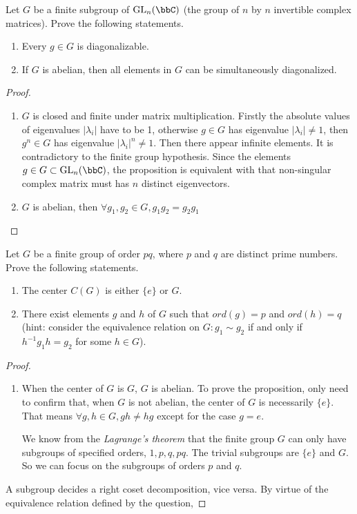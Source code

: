 \begin{exercise}
    Let $G$ be a finite subgroup of $\mathrm{GL}_n(\bbC)$ (the group of $n$ by $n$ invertible complex matrices).
Prove the following statements.
\begin{enumerate}
    \item Every $g \in G$ is diagonalizable.
    \item  If $G$ is abelian, then all elements in $G$ can be simultaneously diagonalized.
\end{enumerate}
\end{exercise}

\begin{proof}
    \begin{enumerate}
        \item $G$ is closed and finite under matrix multiplication. Firstly the absolute values of eigenvalues $|\lambda_i|$ have to be 1, otherwise $g\in G$ has eigenvalue $|\lambda_i|\neq 1$, then $g^n\in G$ has eigenvalue $|\lambda_i|^n\neq 1$. Then there appear infinite elements. It is contradictory to the finite group hypothesis. Since the elements $g\in G \subset \mathrm{GL}_n(\bbC)$, the proposition is equivalent with that non-singular complex matrix must has $n$ distinct eigenvectors.
        \item $G$ is abelian, then $\forall g_1, g_2 \in G, g_1 g_2 =g_2 g_1$
    \end{enumerate}
\end{proof}

\begin{exercise}
    Let $G$ be a finite group of order $pq$, where $p$ and $q$ are distinct prime numbers. Prove the
following statements.
\begin{enumerate}
    \item The center $C(G)$ is either $\{e\}$ or $G$.
    \item  There exist elements $g$ and $h$ of $G$ such that $ord(g) = p$ and $ord(h) = q$ (hint:
    consider the equivalence relation on $G: g_1 \sim g_2$ if and only if $h^{-1} g_{1} h=g_{2}$ for some
    $h \in G$).
\end{enumerate}
\end{exercise}

\begin{proof}

    \begin{enumerate}
        \item When the center of $G$ is $G$, $G$ is abelian. To prove  the proposition, only need to confirm that, when $G$ is not abelian, the center of $G$ is necessarily $\{e\}$. That means $\forall g,h \in G, gh \neq hg$ except for the case $g=e$. 
        
        We know from the \textit{Lagrange's theorem} that the finite group $G$ can only have subgroups of specified orders, $1, p, q, pq$. The trivial subgroups are $\{e\}$ and $G$. So we can focus on the subgroups of orders $p$ and $q$.
    \end{enumerate}

    A subgroup decides a right coset decomposition, vice versa. By virtue of the equivalence relation defined by the question, 
\end{proof}